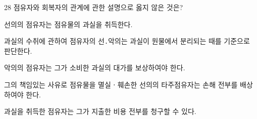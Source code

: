 \begin{question}{28}
점유자와 회복자의 관계에 관한 설명으로 옳지 않은 것은?
\begin{choices}
  \item 선의의 점유자는 점유물의 과실을 취득한다.
  \item 과실의 수취에 관하여 점유자의 선․악의는 과실이 원물에서 분리되는 때를 기준으로 판단한다.
  \item 악의의 점유자는 그가 소비한 과실의 대가를 보상하여야 한다.
  \item 그의 책임있는 사유로 점유물을 멸실ㆍ훼손한 선의의 타주점유자는 손해 전부를 배상하여야 한다.
  \item 과실을 취득한 점유자는 그가 지출한 비용 전부를 청구할 수 있다.
\end{choices}
\end{question}
